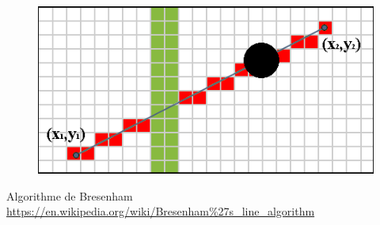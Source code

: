 \documentclass{beamer}
\begin{document}
\begin{frame}
\begin{figure}
\begin{overprint}
						 \includegraphics[width=0.95\linewidth]{graphics/Bresenham_line_4.png}
					\end{overprint}
				\end{figure}
				Algorithme de Bresenham \url{https://en.wikipedia.org/wiki/Bresenham\%27s_line_algorithm}
			\end{frame}
\end{document}
